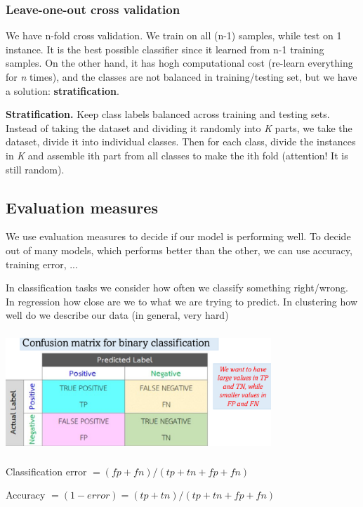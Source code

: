 \documentclass{article}
\begin{document}
\raggedright	
\subsubsection*{Leave-one-out cross validation}

We have n-fold cross validation. We train on all (n-1) samples, while test on 1 instance. It is the best possible classifier since it learned from n-1 training samples. On the other hand, it has hogh computational cost (re-learn everything for \emph{n }times), and the classes are not balanced in training/testing set, but we have a solution: \textbf{stratification}.
\bigskip

\textbf{Stratification.} Keep class labels balanced across training and testing sets. Instead of taking the dataset and dividing it randomly into \emph{K} parts, we take the dataset, divide it into individual classes. Then for each class, divide the instances in \emph{K} and assemble ith part from all classes to make the ith fold (attention! It is still random).

\subsection*{Evaluation measures}
	
We use evaluation measures to decide if our model is performing well. To decide out of many models, which performs better than the other, we can use accuracy, training error, ...

In classification tasks we consider how often we classify something right/wrong. In regression how close are we to what we are trying to predict. In clustering how well do we describe our data (in general, very hard)
	

\centering\includegraphics[width=10cm, height=4.5cm]{img/confusion_matrix.png}	

\raggedright Classification error \( = (fp + fn) / (tp + tn + fp + fn)\)

Accuracy \(= (1 - error) = (tp + tn) / (tp + tn + fp + fn)\)
\end{document}
